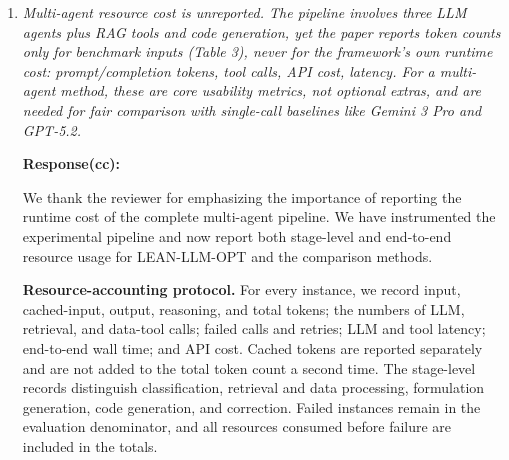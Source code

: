 \documentclass[11pt]{article}
\newcommand{\edit}[1]{{\color{hopkins-blue}\itshape #1}}
\newcommand{\expected}{\noindent\textbf{Expected outputs.} }
\begin{document}
\begin{enumerate}[label=(AssoE.\arabic*),leftmargin=*]
\begin{enumerate}[label=(R2.Major.\arabic*),leftmargin=*]
\medskip
\noindent\textbf{Revised terminology and scope.}
We have revised the manuscript to distinguish \emph{large input scale},
which refers to the volume and structure of the external data, from
\emph{large formulation scale}, which refers to the size of the generated
optimization model. We report the exact observed scale ranges rather than
characterizing the Air-NRM experiments as industrial-scale validation. The
revised practical claim is limited to handling multi-file airline data and
generating formulations containing up to 621 variables and 1,106 constraints
in an offline evaluation. The additional public-benchmark evaluation is
addressed separately in our response to R2.Major.1.

\expected Complete input- and formulation-scale statistics; controlled
scaling results; solve-time and memory results; and corrected large-scale
terminology and claims.

\item \edit{Multi-agent resource cost is unreported. The pipeline involves three LLM agents plus RAG tools and code generation, yet the paper reports token counts only for benchmark inputs (Table 3), never for the framework's own runtime cost: prompt/completion tokens, tool calls, API cost, latency. For a multi-agent method, these are core usability metrics, not optional extras, and are needed for fair comparison with single-call baselines like Gemini 3 Pro and GPT-5.2.}\label{R2-major-3}

\noindent\textbf{Response(cc):}

We thank the reviewer for emphasizing the importance of reporting the runtime
cost of the complete multi-agent pipeline. We have instrumented the
experimental pipeline and now report both stage-level and end-to-end resource
usage for LEAN-LLM-OPT and the comparison methods.

\medskip
\noindent\textbf{Resource-accounting protocol.}
For every instance, we record input, cached-input, output, reasoning, and total
tokens; the numbers of LLM, retrieval, and data-tool calls; failed calls and
retries; LLM and tool latency; end-to-end wall time; and API cost. Cached
tokens are reported separately and are not added to the total token count a
second time. The stage-level records distinguish classification, retrieval and
data processing, formulation generation, code generation, and correction.
Failed instances remain in the evaluation denominator, and all resources
consumed before failure are included in the totals.


\end{enumerate}
\end{enumerate}
\end{document}
